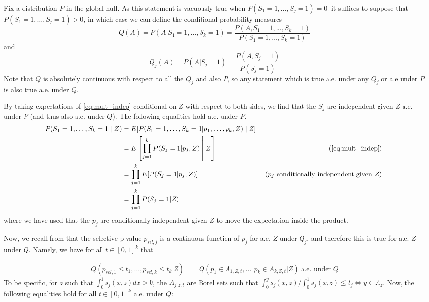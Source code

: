 \documentclass{article}
\begin{document}
\begin{appendix}
Fix a distribution $P$ in the global null. As this statement is vacuously true when $P( S_1=1, \dots, S_j=1) = 0$, it suffices to suppose that  $P( S_1=1, \dots, S_j=1) > 0$, in which case we can define the conditional probability measures 
\begin{equation*}
    Q(A) = P(A| S_1=1, \dots, S_k= 1) = \frac{P(A,  S_1=1, \dots, S_k=1)}{P( S_1=1, \dots, S_k=1)}
\end{equation*}
and 
\begin{equation*}
    Q_j(A) = P(A| S_j=1) = \frac{P(A, S_j=1)}{P( S_j=1)}
\end{equation*}
Note that $Q$ is absolutely continuous with respect to all the $Q_j$ and also $P$, so any statement which is true a.e. under any $Q_j$ or a.e under $P$ is also true a.e. under $Q$.

By taking expectations of \eqref{eq:mult_indep} conditional on $Z$ with respect to both sides, we find that the $S_j$ are independent given $Z$ a.e. under $P$ (and thus also a.e. under $Q$). The following equalities hold a.e. under $P$. 
\begin{align*}
    P(S_1 = 1, \dots, S_k = 1 \mid Z) &= E[P(S_1 = 1, \dots, S_k = 1 | p_1, \dots, p_k, Z) \mid Z] \\
    &= E \left[\prod_{j = 1}^k P(S_j = 1 | p_j, Z) \;\middle|\; Z\right] & \text{(\Cref{eq:mult_indep}) }\\
    &= \prod_{j=1}^k E[P(S_j = 1 | p_j, Z)] & \text{ ($p_j$ conditionally independent given $Z$)  } \\
    &= \prod_{j=1}^k P(S_j = 1 | Z)
\end{align*}
where we have used that the $p_j$ are conditionally independent given $Z$ to move the expectation inside the product. 

Now, we recall from  that the selective p-value $p_{sel, j}$ is a continuous function of $p_j$ for a.e. $Z$ under $Q_j$, and therefore this is true for a.e. $Z$ under $Q$. Namely, we have for all $t \in [0, 1]^k$ that 

\begin{align*}
    Q(p_{sel, 1} \leq t_1,  \dots, p_{sel, k} \leq t_k| Z) &=  Q(p_1 \in A_{1, Z, t}, \dots, p_k \in A_{k, Z, t} |Z) \text{ a.e. under } Q
\end{align*}
To be specific, for $z$ such that $\int_0^1 s_j(x, z)dx > 0 $, the $A_{j, z, t}$ are Borel sets such that $\int_0^y s_j(x, z)/\int_0^1 s_j(x, z) \leq t_j \iff y \in A_z$. Now, the following equalities hold for all $t \in [0, 1]^k$ a.e. under $Q$:


\end{appendix}
\end{document}
